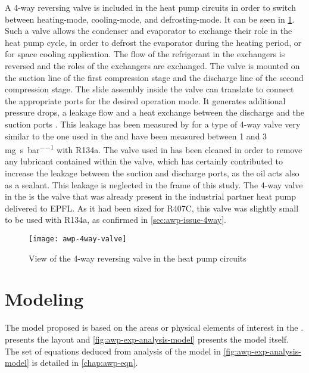 A 4-way reversing valve is included in the heat pump circuits in order
to switch between heating-mode, cooling-mode, and defrosting-mode. It
can be seen in \cref{fig:awp-4way-valve-in-circuits}. Such a valve
allows the condenser and evaporator to exchange their role in the heat
pump cycle, in order to defrost the evaporator during the heating
period, or for space cooling application. The flow of the refrigerant
in the exchangers is reversed and the roles of the exchangers are
exchanged. The valve is mounted on the suction line of the first
compression stage and the discharge line of the second compression
stage. The slide assembly inside the valve can translate to connect
the appropriate ports for the desired operation mode. It generates
additional pressure drops, a leakage flow and a heat exchange between
the discharge and the suction ports
\citep[p.\,4]{bertsch-hubacher-2002a}. This leakage has been measured
by \citet[p.\,39]{bertsch-hubacher-2002a} for a type of 4-way valve
very similar to the one used in the \AWP{} and have been measured
between 1 and 3 \si{\milli\gram\per\second\per\bar} with R134a. The
valve used in \AWP{} has been cleaned in order to remove any lubricant
contained within the valve,
which has certainly contributed to increase the leakage between the
suction and discharge ports, as the oil acts also as a sealant. This
leakage is neglected in the frame of this study. The 4-way valve in
the \AWP{} is the valve that was already present in the industrial
partner heat pump delivered to EPFL. As it had been sized for R407C,
this valve was slightly small to be used with R134a, as confirmed in
\cref{sec:awp-issue-4way}.

\begin{figure}[htbp]
  \centering
  \texttt{[image: awp-4way-valve]}
  \caption{View of the 4-way reversing valve in the heat pump circuits}
  \label{fig:awp-4way-valve-in-circuits}
\end{figure}


\section{Modeling}
\label{sec:awp-model}

The model proposed is based on the areas or physical elements of
interest in the \AWP{}.  presents
the \AWP{} layout and \cref{fig:awp-exp-analysis-model} presents the
model itself. The set of equations deduced from analysis of the model
in \cref{fig:awp-exp-analysis-model} is detailed in
\cref{chap:awp-eqn}.

